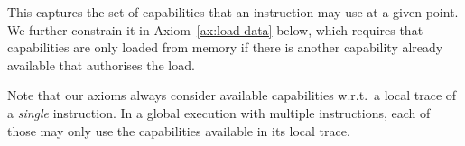 \documentclass[11pt]{article}
\theoremstyle{definition}
\newcommand{\Note}[1]{{\color{magenta}[#1]}}
\begin{document}
This captures the set of capabilities that an instruction may use
at a given point. We further constrain it in Axiom~\ref{ax:load-data} below,
which requires that capabilities are only loaded from memory if there is another
capability already available that authorises the load.

Note that our axioms always consider available capabilities w.r.t.~a local
trace of a \emph{single} instruction.  In a global execution with multiple
instructions, each of those may only use the capabilities available in its
local trace.

%

%
%
%
\end{document}

